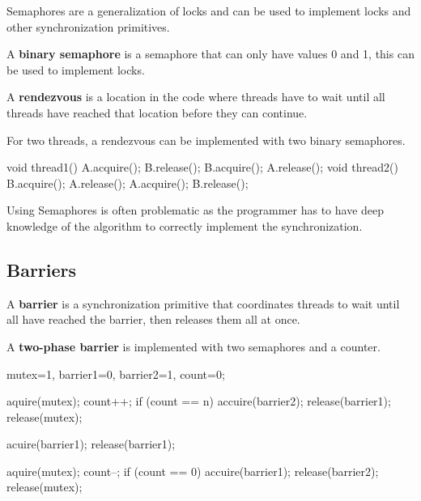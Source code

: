 \begin{remark}
Semaphores are a generalization of locks and can be used to implement locks and other synchronization primitives.
\end{remark}

\begin{definition}
A \textbf{binary semaphore} is a semaphore that can only have values 0 and 1, this can be used to implement locks.
\end{definition}

\begin{definition}
A \textbf{rendezvous} is a location in the code where threads have to wait until all threads have reached that location before they can continue.
\end{definition}

\begin{remark}
For two threads, a rendezvous can be implemented with two binary semaphores.
\end{remark}

\begin{codeexample}
void thread1() {
    A.acquire();
    B.release();
    B.acquire();
    A.release();
}
void thread2() {
    B.acquire(); 
    A.release();
    A.acquire();
    B.release();
}
\end{codeexample}

\begin{important}
Using Semaphores is often problematic as the programmer has to have deep knowledge of the algorithm to correctly implement the synchronization.
\end{important}

\subsection{Barriers}

\begin{definition}
A \textbf{barrier} is a synchronization primitive that coordinates threads to wait until all have reached the barrier, then releases them all at once.
\end{definition}

\begin{definition}
A \textbf{two-phase barrier} is implemented with two semaphores and a counter.
\end{definition}

\begin{codeexample}
mutex=1, barrier1=0, barrier2=1, count=0;

aquire(mutex);
    count++; 
    if (count == n) {
        accuire(barrier2);
        release(barrier1);
    }
release(mutex);

acuire(barrier1); release(barrier1);

aquire(mutex);
    count--;
    if (count == 0) {
        accuire(barrier1);
        release(barrier2);
    }
release(mutex);
\end{codeexample}

